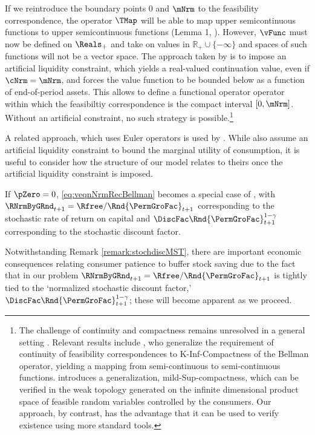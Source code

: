 \documentclass[BufferStockTheory]{subfiles}
\begin{document}
If we reintroduce the boundary points $0$ and $\mNrm$ to the feasibility correspondence, the operator $\TMap$ will be able to map upper semicontinuous functions to upper semicontinuous functions (Lemma 1, \cite{Jaskiewicz2011}).
However, $\vFunc$ must now be defined on $\Reals_{+}$ and take on values in $\mathbb{R}_{+}\cup\{-\infty\}$ and spaces of such functions will not be a vector space.
The approach taken by \cite{Ma2022} is to impose an artificial liquidity constraint, which yields a real-valued continuation value, even if $\cNrm= \mNrm$, and forces the value function to be bounded below as a function of end-of-period assets.
This allows \cite{Ma2022} to define a functional operator operator within which the feasibiltiy correspondence is the compact interval $[0, \mNrm]$.
Without an artificial constraint, no such strategy is possible.\footnote{The challenge of continuity and compactness remains unresolved in a general setting \citep{rinconZapatero2024}.
Relevant results include \cite{Feinberg2012}, who generalize the requirement of continuity of feasibility correspondences to K-Inf-Compactness of the Bellman operator, yielding a mapping from semi-continuous to semi-continuous functions.
\cite{Shanker2017a} introduces a generalization, mild-Sup-compactness, which can be verified in the weak topology generated on the infinite dimensional product space of feasible random variables controlled by the consumers.
Our approach, by contrast, has the advantage that it can be used to verify existence using more standard tools.} 


A related approach, which uses Euler operators is used by \cite{mstIncFluct}.
While \cite{mstIncFluct} also assume an artificial liquidity constraint to bound the marginal utility of consumption, it is useful to consider how the structure of our model relates to theirs  once the artificial liquidity constraint is imposed.


\begin{remark}\label{remark:stochdiscMST}
If $\pZero=0$, \eqref{eq:veqnNrmRecBellman} becomes a special case of \cite{mstIncFluct}, with $\RNrmByGRnd_{t+1}=\Rfree/\Rnd{\PermGroFac}_{t+1}$ corresponding to the stochastic rate of return on capital and $\DiscFac \Rnd{\PermGroFac}_{t+1}^{1-\CRRA}$  corresponding to the stochastic discount factor.
\end{remark}

Notwithstanding Remark \ref{remark:stochdiscMST},  there are important economic consequences relating consumer patience to buffer stock saving due to the fact that in our problem $\RNrmByGRnd_{t+1}=\Rfree/\Rnd{\PermGroFac}_{t+1}$ is tightly tied to the `normalized stochastic discount factor,' $\DiscFac \Rnd{\PermGroFac}_{t+1}^{1-\CRRA}$; these will become apparent as we proceed.
\end{document}
